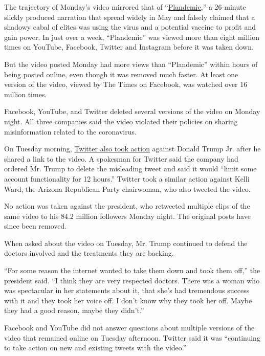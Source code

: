 The trajectory of Monday's video mirrored that of
``\href{https://www.nytimes.com/2020/05/20/technology/plandemic-movie-youtube-facebook-coronavirus.html}{Plandemic},''
a 26-minute slickly produced narration that spread widely in May and
falsely claimed that a shadowy cabal of elites was using the virus and a
potential vaccine to profit and gain power. In just over a week,
``Plandemic'' was viewed more than eight million times on YouTube,
Facebook, Twitter and Instagram before it was taken down.

But the video posted Monday had more views than ``Plandemic'' within
hours of being posted online, even though it was removed much faster. At
least one version of the video, viewed by The Times on Facebook, was
watched over 16 million times.

Facebook, YouTube, and Twitter deleted several versions of the video on
Monday night. All three companies said the video violated their policies
on sharing misinformation related to the coronavirus.

On Tuesday morning,
\href{https://www.nytimes.com/live/2020/07/28/business/stock-market-today-coronavirus/twitter-limits-donald-trump-jrs-account-after-he-shares-virus-misinformation}{Twitter
also took action} against Donald Trump Jr. after he shared a link to the
video. A spokesman for Twitter said the company had ordered Mr. Trump to
delete the misleading tweet and said it would ``limit some account
functionality for 12 hours.'' Twitter took a similar action against
Kelli Ward, the Arizona Republican Party chairwoman, who also tweeted
the video.

No action was taken against the president, who retweeted multiple clips
of the same video to his 84.2 million followers Monday night. The
original posts have since been removed.

When asked about the video on Tuesday, Mr. Trump continued to defend the
doctors involved and the treatments they are backing.

``For some reason the internet wanted to take them down and took them
off,'' the president said. ``I think they are very respected doctors.
There was a woman who was spectacular in her statements about it, that
she's had tremendous success with it and they took her voice off. I
don't know why they took her off. Maybe they had a good reason, maybe
they didn't.''

Facebook and YouTube did not answer questions about multiple versions of
the video that remained online on Tuesday afternoon. Twitter said it was
``continuing to take action on new and existing tweets with the video.''

